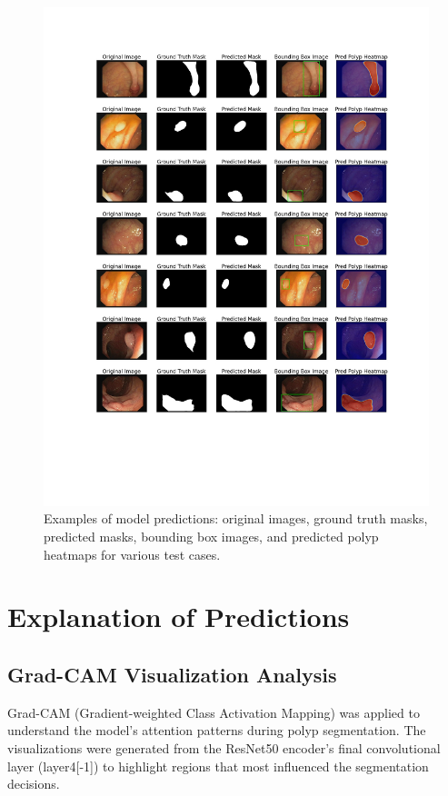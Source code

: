 \documentclass[a4paper,12pt]{report}
\begin{document}
\begin{figure}[htbp]
\centering
\includegraphics[width=\textwidth]{evaluations.jpg}
\caption{Examples of model predictions: original images, ground truth masks, predicted masks, bounding box images, and predicted polyp heatmaps for various test cases.}
\label{fig:segmentation_examples}
\end{figure}

\newpage
\section{Explanation of Predictions}

\subsection{Grad-CAM Visualization Analysis}

Grad-CAM (Gradient-weighted Class Activation Mapping) was applied to understand the model's attention patterns during polyp segmentation. The visualizations were generated from the ResNet50 encoder's final convolutional layer (layer4[-1]) to highlight regions that most influenced the segmentation decisions.
\end{document}
